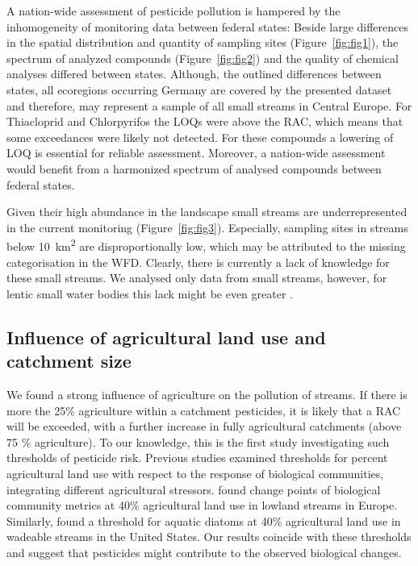 \documentclass[journal=esthag,manuscript=article]{achemso}
\begin{document}
A nation-wide assessment of pesticide pollution is hampered by the inhomogeneity of monitoring data between federal states:
Beside large differences in the spatial distribution and quantity of sampling sites (Figure~\ref{fig:fig1}), the spectrum of analyzed compounds (Figure~\ref{fig:fig2}) and the quality of chemical analyses differed between states. 
Although, the outlined differences between states, all ecoregions occurring Germany \citep{illies1978limnofauna,abell2008freshwater} are covered by the presented dataset and therefore, may represent a sample of all small streams in Central Europe. 
For Thiacloprid and Chlorpyrifos the LOQs were above the RAC, which means that some exceedances were likely not detected.
For these compounds a lowering of LOQ is essential for reliable assessment.
Moreover, a nation-wide assessment would benefit from a harmonized spectrum of analysed compounds between federal states. 

Given their high abundance in the landscape \citep{nadeau_hydrological_2007} small streams are underrepresented in the current monitoring (Figure~\ref{fig:fig3}). 
Especially, sampling sites in streams below 10~km\textsuperscript{2} are disproportionally low, which may be attributed to the missing categorisation in the WFD. 
Clearly, there is currently a lack of knowledge for these small streams.
We analysed only data from small streams, however, for lentic small water bodies this lack might be even greater \citep{lorenz_specifics_2016}. 



\subsection{Influence of agricultural land use and catchment size}
We found a strong influence of agriculture on the pollution of streams.
If there is more the 25\% agriculture within a catchment pesticides, it is likely that a RAC will be exceeded, with a further increase in fully agricultural catchments (above 75 \% agriculture).
To our knowledge, this is the first study investigating such thresholds of pesticide risk.
Previous studies examined thresholds for percent agricultural land use with respect to the response of biological communities, integrating different agricultural stressors.
\citet{feld_response_2013} found change points of biological community metrics at 40\% agricultural land use in lowland streams in Europe.
Similarly, \citet{waite_agricultural_2014} found a threshold for aquatic diatoms at 40\% agricultural land use in wadeable streams in the United States.
Our results coincide with these thresholds and suggest that pesticides might contribute to the observed biological changes. 
\end{document}
